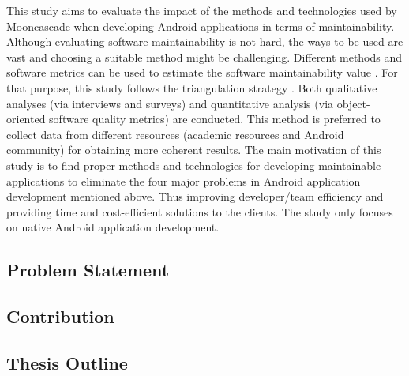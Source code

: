 This study aims to evaluate the impact of the methods and technologies used by Mooncascade when developing Android applications in terms of maintainability. Although evaluating software maintainability is not hard, the ways to be used are vast and choosing a suitable method might be challenging. Different methods and software metrics can be used to estimate the software maintainability value \cite{34,23,26,33,36,45}. For that purpose, this study follows the triangulation strategy \cite{51}. Both qualitative analyses (via interviews and surveys) and quantitative analysis (via object-oriented software quality metrics) are conducted. This method is preferred to collect data from different resources (academic resources and Android community) for obtaining more coherent results. The main motivation of this study is to find proper methods and technologies for developing maintainable applications to eliminate the four major problems in Android application development mentioned above. Thus improving developer/team efficiency and providing time and cost-efficient solutions to the clients. The study only focuses on native Android application development.

\subsection{Problem Statement}
\label{section:1.1}


\subsection{Contribution}


\newpage
\subsection{Thesis Outline}
